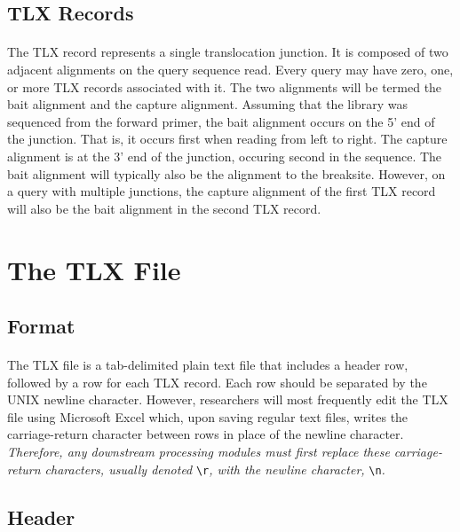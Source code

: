 \documentclass{article}
\begin{document}
\subsection{TLX Records}
\paragraph{} The TLX record represents a single translocation junction. It is composed of two adjacent alignments on the query sequence read. Every query may have zero, one, or more TLX records associated with it. The two alignments will be termed the bait alignment and the capture alignment. Assuming that the library was sequenced from the forward primer, the bait alignment occurs on the 5' end of the junction. That is, it occurs first when reading from left to right. The capture alignment is at the 3' end of the junction, occuring second in the sequence. The bait alignment will typically also be the alignment to the breaksite. However, on a query with multiple junctions, the capture alignment of the first TLX record will also be the bait alignment in the second TLX record.

\section{The TLX File}

\subsection{Format}
\paragraph{} The TLX file is a tab-delimited plain text file that includes a header row, followed by a row for each TLX record. Each row should be separated by the UNIX newline character. However, researchers will most frequently edit the TLX file using Microsoft Excel which, upon saving regular text files, writes the carriage-return character between rows in place of the newline character. \emph{Therefore, any downstream processing modules must first replace these carriage-return characters, usually denoted} \texttt{\textbackslash{}r}\emph{, with the newline character,} \texttt{\textbackslash{}n}\emph{.}

\subsection{Header}
\end{document}
